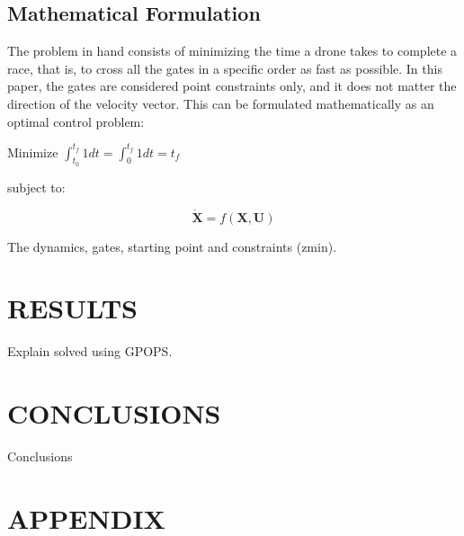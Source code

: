 \documentclass[letterpaper, 10 pt, conference]{ieeeconf}  %
\begin{document}
\subsection{Mathematical Formulation}
The problem in hand consists of minimizing the time a drone takes to complete a race, that is, to cross all the gates in a specific order as fast as possible. In this paper, the gates are considered point constraints only, and it does not matter the direction of the velocity vector. This can be formulated mathematically as an optimal control problem:

\bigskip

Minimize \quad $\int_{t_0}^{t_f} 1 dt = \int_{0}^{t_f} 1 dt = t_f$

\bigskip

subject to:

$$ \bm{\dot{X}} = f(\boldsymbol{X}, \boldsymbol{U}) $$



The dynamics, gates, starting point and constraints (zmin).



\section{RESULTS}\label{s:exp}

Explain solved using GPOPS.

  

\section{CONCLUSIONS}\label{s:conclusions}

Conclusions

\addtolength{\textheight}{-12cm}   %

\section*{APPENDIX}
\end{document}
